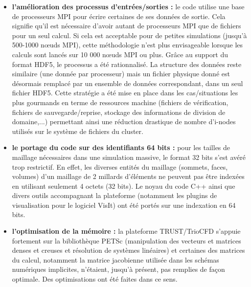 \begin{itemize}
	\item \textbf{l'am\'elioration des processus d'entr\'ees/sorties :} le code utilise une base de	processeurs MPI pour \'ecrire certaines de ses donn\'ees de sortie. Cela signifie qu'il est n\'ecessaire d'avoir autant de processeurs MPI que de fichiers pour un seul calcul. Si cela est acceptable pour de petites simulations (jusqu'\`a 500-1000 n\oe{}uds MPI), cette m\'ethodologie n'est plus envisageable lorsque les calculs sont lanc\'es sur 10 000 n\oe{}uds MPI ou plus. Gr\^ace au support du format HDF5, le processus a 	\'et\'e rationnalis\'e. La structure des donn\'ees reste similaire (une donn\'ee par processeur) mais un fichier physique donn\'e est d\'esormais remplac\'e par un ensemble de donn\'ees correspondant, dans un seul 	fichier HDF5. Cette strat\'egie a \'et\'e mise en place dans les cas/situations les plus gourmands en terme de ressources machine (fichiers de v\'erification, fichiers de sauvegarde/reprise, stockage des informations de 	division de domaine,...) permettant ainsi une r\'eduction drastique de nombre d'i-nodes utilis\'es sur le système de fichiers du cluster.
	\item \textbf{le portage du code sur des identifiants 64 bits :} pour les tailles de maillage n\'ecessaires dans une simulation massive, le format 32 bits s'est av\'er\'e trop restrictif. En effet, les diverses entit\'es du maillage (sommets, faces, volumes) d'un maillage de 2 millards d'\'el\'ements ne peuvent pas \^etre index\'ees en utilisant seulement 4 octets (32 bits). Le noyau du code C++ ainsi que divers outils 	accompagnant la plateforme (notamment les plugins de visualisation pour le logiciel VisIt) ont \'et\'e port\'es sur une indexation en 64 bits.
	\item \textbf{l'optimisation de la m\'emoire :} la plateforme TRUST/TrioCFD s'appuie fortement sur la biblioth\`eque PETSc (manipulation des vecteurs et matrices denses et creuses et r\'esolution de syst\`emes lin\'eaires) et certaines des matrices du calcul, notamment la matrice jacobienne utilis\'ee dans les sch\'emas num\'eriques implicites, n'\'etaient, jusqu'\`a pr\'esent, pas remplies de fa\c con optimale. Des optimisations ont \'et\'e faites dans ce sens.
\end{itemize}

